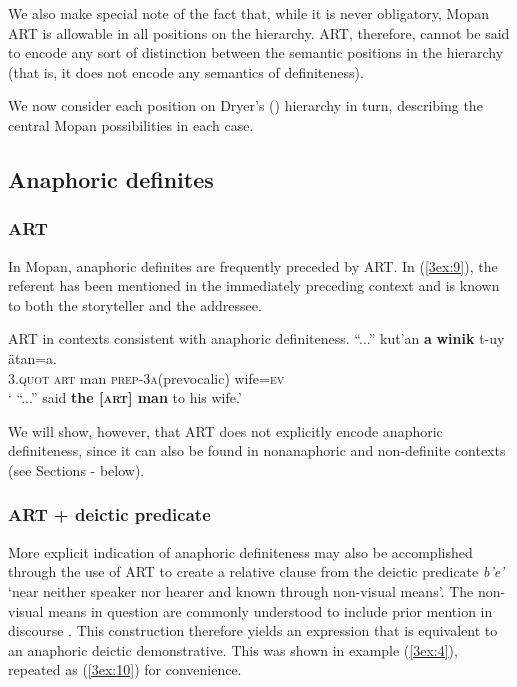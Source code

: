 \documentclass[output=paper]{langsci/langscibook}
\begin{document}
We also make special note of the fact that, while it is never obligatory, Mopan ART is allowable in all positions on the hierarchy.  ART, therefore, cannot be said to encode any sort of distinction between the semantic positions in the hierarchy (that is, it does not encode any semantics of definiteness).  

We now consider each position on Dryer's (\citeyear{dryer:14}) hierarchy in turn, describing the central Mopan possibilities in each case.


\subsection{Anaphoric definites}\label{3sec:31}

\subsubsection{ART}\label{3sec:311}
In Mopan, anaphoric definites are frequently preceded by ART. In (\ref{3ex:9}), the referent has been mentioned in the immediately preceding context and is known to both the storyteller and the addressee.

\begin{exe}
\ex\label{3ex:9}
ART in contexts consistent with anaphoric definiteness. 
\exi{}
\gll	``...'' 	kut'an		{\textbf{a}}	{\textbf{winik}}		t-uy					\"atan=a. \\
	{}	3.{\textsc{quot}}	{\textsc{art}}	man			{\textsc{prep-3a}}(prevocalic)	wife{\textsc{=ev}} \\
\glt	` ``...'' said {\textbf{the [{\textsc{art}}] man}} to his wife.'
\end{exe}

We will show, however, that ART does not explicitly encode anaphoric definiteness, since it can also be found in nonanaphoric and non-definite contexts (see Sections - below).

\subsubsection{ART + deictic predicate}\label{3sec:312}

More explicit indication of anaphoric definiteness may also be accomplished through the use of ART to create a relative clause from the deictic predicate {\emph{b'e'}} `near neither speaker nor hearer and known through non-visual means'. The non-visual means in question are commonly understood to include prior mention in discourse \citep{danziger:94}. This construction therefore yields an expression that is equivalent to an anaphoric deictic demonstrative. This was shown in example (\ref{3ex:4}), repeated as (\ref{3ex:10}) for convenience.
\end{document}
